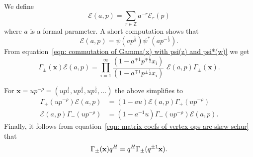\documentclass[12pt]{amsart}
\newcommand{\znums} {{\mathbb Z}}		%
\newcommand{\half}{\frac{1}{2}}
\theoremstyle{definition}
\newcommand{\E}{\mathcal{E}}
\newcommand{\ptotheminusrho}{p^{-\rho}}
\begin{document}
We define
\[
\E (a,p) = \sum_{r\in \znums} a^{-r} \E_{r}(p)
\]
where $a$ is a formal parameter. A short computation shows that 
\[
\E (a,p) = \psi (ap^{\half})\psi^{*} (ap^{-\half}).
\]
From equation~\eqref{eqn: commutation of Gamma(x) with psi(z) and
psi*(w)} we get
\[
\Gamma_{\pm}(\mathbf{x})\E (a,p) =\prod_{i=1}^{\infty}\frac{(1-a^{\mp
1}p^{\mp \half}x_{i})}{(1-a^{\mp
1}p^{\pm \half}x_{i})}\,\, \E (a,p)\Gamma_{\pm}(\mathbf{x}). 
\]

For
$\mathbf{x}=u\ptotheminusrho =(up^{\frac{1}{2}},up^{\frac{3}{2}},up^{\frac{5}{2}},\dots )
$ the above simplifies to 
\begin{align}\label{eqn: commutation of Gamma+- with E(a,p)}
\Gamma_{+}(u\ptotheminusrho ) \E (a,p) &= (1-au) \E (a,p) \Gamma_{+}(u\ptotheminusrho )\\
\E (a,p) \Gamma_{-}(u\ptotheminusrho ) &= (1-a^{-1}u) \Gamma_{-}(u\ptotheminusrho )
\E (a,p). \nonumber
\end{align}
Finally, it follows from equation~\eqref{eqn: matrix coefs of vertex
ops are skew schur} that
\begin{equation}\label{eqn: commutation of Gamma and q^{H}}
\Gamma_{\pm}(\mathbf{x})q^{H} = q^{H} \Gamma_{\pm}(q^{\pm 1}\mathbf{x}). 
\end{equation}
\end{document}
